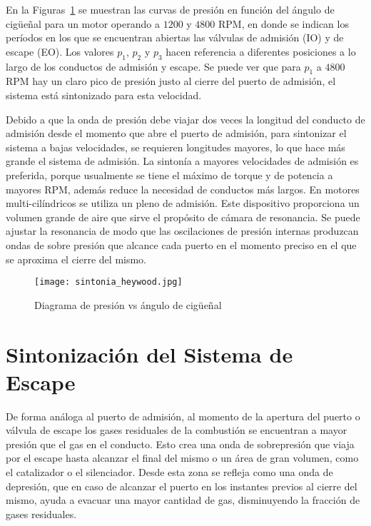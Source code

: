 En la Figuras~\ref{fig:sintonia_heywood} se muestran las curvas de presión en
función del ángulo de cigüeñal para un motor operando a $1200$ y $4800$ RPM, en
donde se indican los períodos en los que se encuentran abiertas las válvulas de
admisión (IO) y de escape (EO).
%
Los valores $p_{1}$, $p_{2}$ y $p_{3}$ hacen referencia a diferentes posiciones
a lo largo de los conductos de admisión y escape.
%
Se puede ver que para $p_{1}$ a $4800$ RPM hay un claro pico de presión justo al
cierre del puerto de admisión, el sistema está sintonizado para esta velocidad.

Debido a que la onda de presión debe viajar dos veces la longitud del conducto
de admisión desde el momento que abre el puerto de admisión, para sintonizar el
sistema a bajas velocidades, se requieren longitudes mayores, lo que hace más
grande el sistema de admisión.
%
La sintonía a mayores velocidades de admisión es preferida, porque usualmente se
tiene el máximo de torque y de potencia a mayores RPM, además reduce la
necesidad de conductos más largos.
%
En motores multi-cilíndricos se utiliza un pleno de admisión.
%
Este dispositivo proporciona un volumen grande de aire que sirve el propósito de
cámara de resonancia.
%
Se puede ajustar la resonancia de modo que las oscilaciones de presión internas
produzcan ondas de sobre presión que alcance cada puerto en el momento preciso
en el que se aproxima el cierre del mismo.

\begin{figure} \centering
\texttt{[image: sintonia\_heywood.jpg]}
    \caption{Diagrama de presión vs ángulo de cigüeñal~\parencite{heywood}}\label{fig:sintonia_heywood}
\end{figure}

\section{Sintonización del Sistema de Escape}\label{cap2_sec_sintonia_escape}

De forma análoga al puerto de admisión, al momento de la apertura del puerto o
válvula de escape los gases residuales de la combustión se encuentran a  mayor
presión que el gas en el conducto.
%
Esto crea una onda de sobrepresión que viaja por el escape hasta alcanzar el
final del mismo o un área de gran volumen, como el catalizador o el silenciador.
%
Desde esta zona se refleja como una onda de depresión, que en caso de alcanzar
el puerto en los instantes previos al cierre del mismo, ayuda a evacuar una
mayor cantidad de gas, disminuyendo la fracción de gases residuales.

